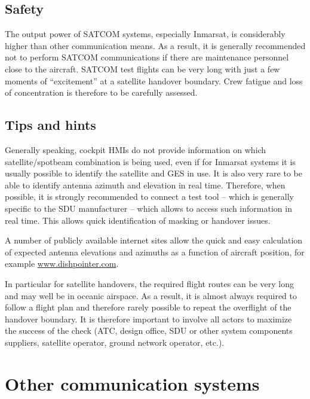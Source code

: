 \documentclass[
]{book}
\begin{document}
\hypertarget{safety-2}{%
\subsection{Safety}\label{safety-2}}

The output power of SATCOM systems, especially Inmarsat, is considerably higher
than other communication means. As a result, it is generally recommended not to
perform SATCOM communications if there are maintenance personnel close to the
aircraft. SATCOM test flights can be very long with just a few moments of
``excitement'' at a satellite handover boundary. Crew fatigue and loss of
concentration is therefore to be carefully assessed.

\hypertarget{tips-and-hints-2}{%
\subsection{Tips and hints}\label{tips-and-hints-2}}

Generally speaking, cockpit HMIs do not provide information on which
satellite/spotbeam combination is being used, even if for Inmarsat systems it
is usually possible to identify the satellite and GES in use. It is also very
rare to be able to identify antenna azimuth and elevation in real time.
Therefore, when possible, it is strongly recommended to connect a test tool --
which is generally specific to the SDU manufacturer -- which allows to access
such information in real time. This allows quick identification of masking or
handover issues.

A number of publicly available internet sites allow the quick and easy
calculation of expected antenna elevations and azimuths as a function of
aircraft position, for example \href{http://www.dishpointer.com}{www.dishpointer.com}.

In particular for satellite handovers, the required flight routes can be very
long and may well be in oceanic airspace. As a result, it is almost always
required to follow a flight plan and therefore rarely possible to repeat the
overflight of the handover boundary. It is therefore important to involve all
actors to maximize the success of the check (ATC, design office, SDU or other
system components suppliers, satellite operator, ground network operator,
etc.).

\hypertarget{other-communication-systems}{%
\section{Other communication systems}\label{other-communication-systems}}
\end{document}
